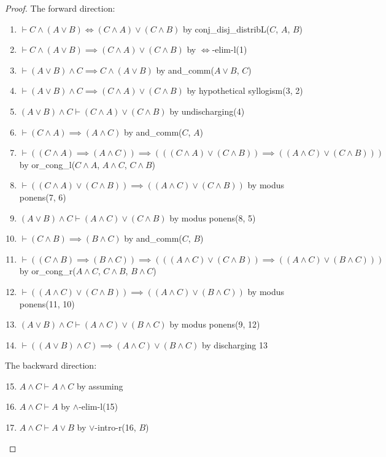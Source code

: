 \begin{proof}
The forward direction:
\begin{enumerate}
\item $\vdash C\land(A\lor B)\iff(C\land A)\lor(C\land B)$ by
  {\Tt{}conj{\_}disj{\_}distribL\nwendquote}($C$, $A$, $B$)%
\item $\vdash C\land(A\lor B)\implies(C\land A)\lor(C\land B)$ by $\Leftrightarrow$-elim-l(1)%
\item $\vdash (A\lor B)\land C\implies C\land(A\lor B)$ by
  {\Tt{}and{\_}comm\nwendquote}($A\lor B$, $C$)%
\item $\vdash (A\lor B)\land C\implies(C\land A)\lor(C\land B)$ by
  hypothetical syllogism(3, 2)%
\item $(A\lor B)\land C\vdash(C\land A)\lor(C\land B)$ by undischarging(4)%
\item $\vdash(C\land A)\implies(A\land C)$ by {\Tt{}and{\_}comm\nwendquote}($C$, $A$)%
\item $\vdash((C\land A)\implies(A\land C))\implies(((C\land A)\lor(C\land B))\implies((A\land C)\lor(C\land B)))$
  by {\Tt{}or{\_}cong{\_}l\nwendquote}($C\land A$, $A\land C$, $C\land B$)%
\item $\vdash((C\land A)\lor(C\land B))\implies((A\land C)\lor(C\land B))$
  by modus ponens(7, 6)%
\item $(A\lor B)\land C\vdash(A\land C)\lor(C\land B)$ by modus
  ponens(8, 5)%
\item $\vdash(C\land B)\implies(B\land C)$ by {\Tt{}and{\_}comm\nwendquote}($C$, $B$)%
\item $\vdash((C\land B)\implies(B\land C))\implies(((A\land
  C)\lor(C\land B))\implies((A\land C)\lor(B\land C)))$ by
  {\Tt{}or{\_}cong{\_}r\nwendquote}($A\land C$, $C\land B$, $B\land C$)%
\item $\vdash((A\land C)\lor(C\land B))\implies((A\land C)\lor(B\land C))$ by modus
  ponens(11, 10)%
\item $(A\lor B)\land C\vdash(A\land C)\lor(B\land C)$ by modus
  ponens(9, 12)%
\item $\vdash((A\lor B)\land C)\implies(A\land C)\lor(B\land C)$ by
  discharging 13%
\end{enumerate}
The backward direction:
\begin{enumerate}\setcounter{enumi}{14}
\item $A\land C\vdash A\land C$ by assuming%
\item $A\land C\vdash A$ by $\land$-elim-l(15)%
\item $A\land C\vdash A\lor B$ by $\lor$-intro-r(16, $B$)%

\end{enumerate}
\end{proof}
